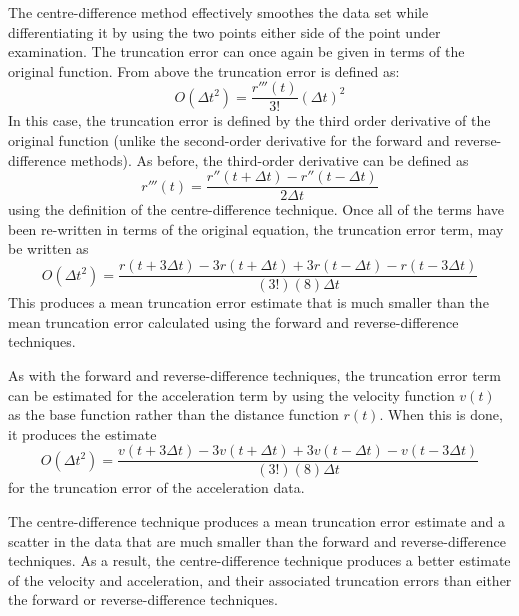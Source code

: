 
The centre-difference method effectively smoothes the data set while differentiating it by using the two points either side of the point under examination. The truncation error can once again be given in terms of the original function. From above the truncation error is defined as:
\begin{equation}
O(\Delta t^{2}) = \frac{r'''(t)}{3!}(\Delta t)^{2}
\end{equation}
In this case, the truncation error is defined by the third order derivative of the original function (unlike the second-order derivative for the forward and reverse-difference methods). As before, the third-order derivative can be defined as
\begin{equation}
r'''(t) = \frac{r''(t + \Delta t) - r''(t - \Delta t)}{2 \Delta t} 
\end{equation}
using the definition of the centre-difference technique. Once all of the terms have been re-written in terms of the original equation, the truncation error term, may be written as
\begin{equation}
O(\Delta t^{2}) = \frac{r(t + 3\Delta t) - 3r(t + \Delta t) + 3r(t - \Delta t) - r(t - 3\Delta t)}{(3!)(8)\Delta t}
\end{equation}
This produces a mean truncation error estimate that is much smaller than the mean truncation error calculated using the forward and reverse-difference techniques.

As with the forward and reverse-difference techniques, the truncation error term can be estimated for the acceleration term by using the velocity function $v(t)$ as the base function rather than the distance function $r(t)$. When this is done, it produces the estimate
\begin{equation}
O(\Delta t^{2}) = \frac{v(t + 3\Delta t) - 3v(t + \Delta t) + 3v(t - \Delta t) - v(t - 3\Delta t)}{(3!)(8)\Delta t}
\end{equation}
for the truncation error of the acceleration data. 

The centre-difference technique produces a mean truncation error estimate and a scatter in the data that are much smaller than the forward and reverse-difference techniques. As a result, the centre-difference technique produces a better estimate of the velocity and acceleration, and their associated truncation errors than either the forward or reverse-difference techniques.